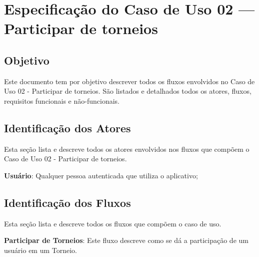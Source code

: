 \section*{Especificação do Caso de Uso 02 --- Participar de torneios}
\subsection*{Objetivo}
Este documento tem por objetivo descrever todos os fluxos envolvidos no Caso de Uso 02 - Participar de torneios. São listados e detalhados todos os atores, fluxos, requisitos funcionais e não-funcionais.

\subsection*{Identificação dos Atores}
Esta seção lista e descreve todos os atores envolvidos nos fluxos que compõem o Caso de Uso 02 - Participar de torneios.
\begin{lista}
  \item \textbf{Usuário}: Qualquer pessoa autenticada que utiliza o aplicativo;
\end{lista}

\subsection*{Identificação dos Fluxos}
Esta seção lista e descreve todos os fluxos que compõem o caso de uso.
\begin{lista}
  \item \textbf{Participar de Torneios}: Este fluxo descreve como se dá a participação de um usuário em um Torneio.
\end{lista}

